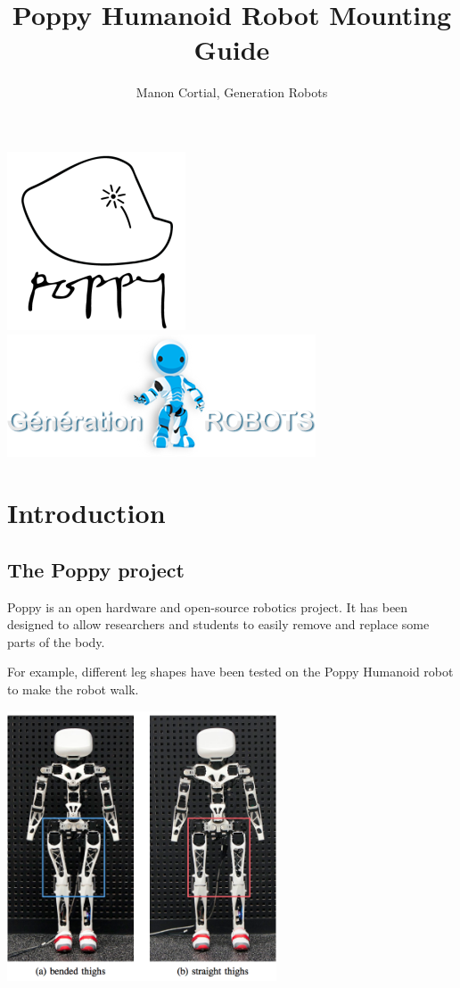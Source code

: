 \documentclass{article}
\begin{document}
\title{Poppy Humanoid Robot Mounting Guide}
\author{Manon Cortial, Generation Robots}

\maketitle

  \includegraphics[height=0.22\textwidth]{img/poppy-logo} \hfill \includegraphics[height=0.22\textwidth]{img/GR-logo}

\section{Introduction}

\subsection{The Poppy project}

Poppy is an open hardware and open-source robotics project. It has been designed to allow researchers and students to easily remove and replace some parts of the body. 

For example,   different leg shapes have been tested on the Poppy Humanoid robot to make the robot walk.

 \begin{center}
  \includegraphics[width=0.6\textwidth]{img/humanoids2013_Experiments}
 \end{center}
\end{document}
